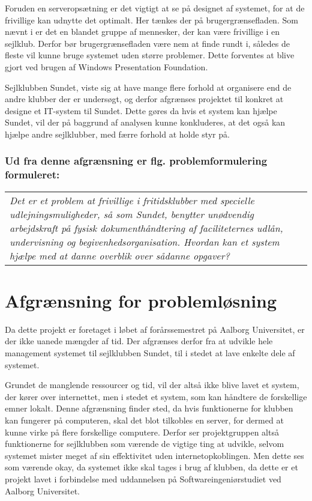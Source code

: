 Foruden en serveropsætning er det vigtigt at se på designet af systemet, for at de frivillige kan udnytte det
optimalt. Her tænkes der på brugergrænsefladen. Som nævnt i 
er det en blandet gruppe af mennesker, der kan være frivillige i en sejlklub. Derfor bør brugergrænsefladen
være nem at finde rundt i, således de fleste vil kunne bruge systemet uden større problemer. Dette
forventes at blive gjort ved brugen af Windows Presentation Foundation.

Sejlklubben Sundet, viste sig at have mange flere forhold at organisere end de andre klubber der er undersøgt, og
derfor afgrænses projektet til konkret at designe et IT-system til Sundet. Dette gøres da hvis et system kan
hjælpe Sundet, vil der på baggrund af analysen kunne konkluderes, at det også kan hjælpe andre sejlklubber,
med færre forhold at holde styr på.

\subsubsection*{Ud fra denne afgrænsning er flg. problemformulering formuleret:}

\begin{center}
  \begin{tabular}{|p{14cm}|}
    \textit{Det er et problem at frivillige i fritidsklubber med specielle udlejningsmuligheder, så som Sundet, benytter unødvendig arbejdskraft på fysisk dokumenthåndtering af faciliteternes udlån, undervisning og begivenhedsorganisation. Hvordan kan et system hjælpe med at danne overblik over sådanne opgaver?}
  \end{tabular}
\end{center}


\section{Afgrænsning for problemløsning}

Da dette projekt er foretaget i løbet af forårssemestret på Aalborg Universitet, er der ikke uanede mængder af tid. Der
afgrænses derfor fra at udvikle hele management systemet til sejlklubben Sundet, til i stedet at lave enkelte
dele af systemet.

Grundet de manglende ressourcer og tid, vil der altså ikke blive lavet et system, der kører over internettet,
men i stedet et system, som kan håndtere de forskellige emner lokalt. 
Denne afgrænsning finder sted, da hvis
funktionerne for klubben kan fungerer på computeren, skal det blot tilkobles en server, for dermed at kunne
virke på flere forskellige computere.
Derfor ser projektgruppen altså funktionerne for sejlklubben som værende de vigtige ting at udvikle, selvom systemet mister meget af sin effektivitet uden internetopkoblingen. 
Men dette ses som værende okay, da systemet ikke skal tages i brug af klubben, da dette er et projekt lavet i
forbindelse med uddannelsen på Softwareingeniørstudiet ved Aalborg Universitet.

